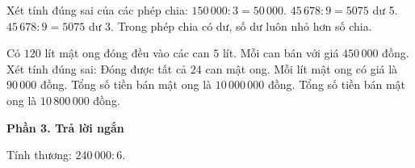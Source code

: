 \begin{ex} %
Xét tính đúng sai của các phép chia:
\choiceTF
{\True $150\,000 : 3 = 50\,000$.}
{$45\,678 : 9 = 5075$ dư 5.}
{\True $45\,678 : 9 = 5075$ dư 3.}
{\True Trong phép chia có dư, số dư luôn nhỏ hơn số chia.}
\end{ex}

\begin{ex} %
Có $120$ lít mật ong đóng đều vào các can $5$ lít. Mỗi can bán với giá $450\,000$ đồng. Xét tính đúng sai:
\choiceTF
{\True Đóng được tất cả $24$ can mật ong.}
{\True Mỗi lít mật ong có giá là $90\,000$ đồng.}
{Tổng số tiền bán mật ong là $10\,000\,000$ đồng.}
{\True Tổng số tiền bán mật ong là $10\,800\,000$ đồng.}
\end{ex}

\textbf{Phần 3. Trả lời ngắn}

\begin{ex} %
Tính thương: $240\,000 : 6$.
\end{ex}


